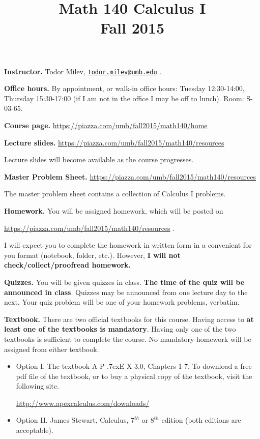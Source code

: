 \documentclass{article}
\title{Math 140 Calculus I \\ Fall 2015}
\date{}
\newcommand{\apex}{A\kern -1pt \lower -2pt\hbox{P}\kern -4pt \lower .7ex\hbox{E}\kern -1pt X}
\newcommand{\websitebase}{https://piazza.com/umb/fall2015/math140}
\begin{document}
\maketitle

\noindent \textbf{Instructor.} Todor Milev, \href{mailto:todor.milev@umb.edu}{\nolinkurl{todor.milev@umb.edu}} \quad \quad \quad .

\medskip
\noindent \textbf{Office hours. } By appointment, or walk-in office hours: Tuesday 12:30-14:00, Thursday 15:30-17:00 (if I am not in the office I may be off to lunch).  Room: S-03-65.

\medskip
\noindent \textbf{Course page. }  \url{\websitebase/home}




\medskip \noindent \textbf{Lecture slides. }  \url{\websitebase/resources}

\medskip\noindent Lecture slides will become available as the course progresses.


\medskip \noindent \textbf{Master Problem Sheet. }  \url{\websitebase/resources} 

\medskip\noindent The master problem sheet contains a collection of Calculus I problems. 

\medskip
\noindent \textbf{Homework.} You will be assigned homework, which will be posted on

\url{\websitebase/resources} \quad \quad \quad .

\noindent I will expect you to complete the homework in written form in a convenient for you format (notebook, folder, etc.). However, \textbf{I will not check/collect/proofread homework.} 
 
\medskip
\noindent \textbf{Quizzes.} You will be given quizzes in class. \textbf{The time of the quiz will be announced in class}. Quizzes may be announced from one lecture day to the next. Your quiz problem will be one of your homework problems, verbatim. 





\medskip\noindent \textbf{Textbook. } There are two official textbooks for this course. Having access to \textbf{at least one of the textbooks is mandatory}. Having only one of the two textbooks is sufficient to complete the course. No mandatory homework will be assigned from either textbook. 

\begin{itemize}
\item Option I. The textbook \apex{} 3.0, Chapters 1-7. To download a free pdf file of the textbook, or to buy a physical copy of the textbook, visit the following site.

\url{http://www.apexcalculus.com/downloads/} 
\item Option II. James Stewart, Calculus, $7^{th}$ or $8^{th}$ edition (both editions are acceptable).
\end{itemize}
\end{document}
